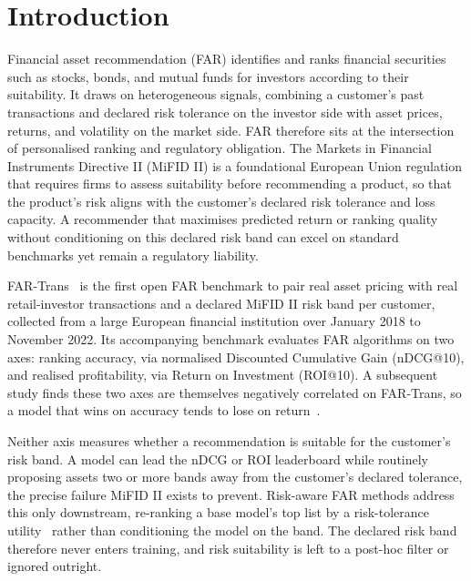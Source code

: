 \section{Introduction}
\label{sec:intro}

Financial asset recommendation (FAR) identifies and ranks financial securities such as stocks, bonds, and mutual funds for investors according to their suitability. It draws on heterogeneous signals, combining a customer's past transactions and declared risk tolerance on the investor side with asset prices, returns, and volatility on the market side. FAR therefore sits at the intersection of personalised ranking and regulatory obligation. The Markets in Financial Instruments Directive II (MiFID II) is a foundational European Union regulation that requires firms to assess suitability before recommending a product, so that the product's risk aligns with the customer's declared risk tolerance and loss capacity. A recommender that maximises predicted return or ranking quality without conditioning on this declared risk band can excel on standard benchmarks yet remain a regulatory liability.

FAR-Trans~\cite{sanzcruzado2024fartransinvestmentdatasetfinancial} is the first open FAR benchmark to pair real asset pricing with real retail-investor transactions and a declared MiFID II risk band per customer, collected from a large European financial institution over January 2018 to November 2022. Its accompanying benchmark evaluates FAR algorithms on two axes: ranking accuracy, via normalised Discounted Cumulative Gain (nDCG@10), and realised profitability, via Return on Investment (ROI@10). A subsequent study finds these two axes are themselves negatively correlated on FAR-Trans, so a model that wins on accuracy tends to lose on return~\cite{10.1145/3780097}.

Neither axis measures whether a recommendation is suitable for the customer's risk band. A model can lead the nDCG or ROI leaderboard while routinely proposing assets two or more bands away from the customer's declared tolerance, the precise failure MiFID II exists to prevent. Risk-aware FAR methods address this only downstream, re-ranking a base model's top list by a risk-tolerance utility~\cite{10.1145/3773966.3779383} rather than conditioning the model on the band. The declared risk band therefore never enters training, and risk suitability is left to a post-hoc filter or ignored outright.

